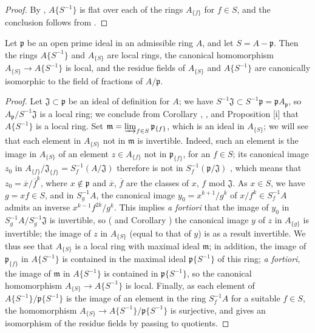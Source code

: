 \begin{proof}
By , $A\{S^{-1}\}$ is flat over each of the rings $A_{\{f\}}$ for
$f\in S$, and the conclusion follows from .
\end{proof}

\begin{proposition}[7.6.17]
\label{0.7.6.17}
Let $\mathfrak{p}$ be an open prime ideal in an admissible ring $A$, and let $S=A-\mathfrak{p}$.
Then the rings $A\{S^{-1}\}$ and $A_{\{S\}}$ are local rings, the canonical homomorphism
$A_{\{S\}}\to A\{S^{-1}\}$ is local, and the residue fields of $A_{\{S\}}$ and $A\{S^{-1}\}$ are
canonically isomorphic to the field of fractions of $A/\mathfrak{p}$.
\end{proposition}

\begin{proof}
Let $\mathfrak{J}\subset\mathfrak{p}$ be an ideal of definition for $A$; we have
$S^{-1}\mathfrak{J}\subset S^{-1}\mathfrak{p}=\mathfrak{p}A_\mathfrak{p}$, so
$A_\mathfrak{p}/S^{-1}\mathfrak{J}$ is a local ring; we conclude from 
Corollary , , and
Proposition [i] that $A\{S^{-1}\}$ is a local ring. Set
$\mathfrak{m}=\varinjlim_{f\in S}\mathfrak{p}_{\{f\}}$, which is an ideal in $A_{\{S\}}$; we
will see that each element in $A_{\{S\}}$ not in $\mathfrak{m}$ is invertible. Indeed, such an
element is the image in $A_{\{S\}}$ of an element $z\in A_{\{f\}}$ not in $\mathfrak{p}_{\{f\}}$,
for an $f\in S$; its canonical image $z_0$ in
$A_{\{f\}}/\mathfrak{J}_{\{f\}}=S_f^{-1}(A/\mathfrak{J})$ therefore is not in
$S_f^{-1}(\mathfrak{p}/\mathfrak{J})$ , which means that
$z_0=\overline{x}/\overline{f}^k$, where $x\not\in\mathfrak{p}$ and $\overline{x}$, $\overline{f}$
are the classes of $x$, $f$ mod $\mathfrak{J}$. As $x\in S$, we have $g=xf\in S$, and in
$S_g^{-1}A$, the canonical image $y_0=x^{k+1}/g^k$ of $x/f^k\in S_f^{-1}A$ admits an inverse
$x^{k-1}f^{2k}/g^k$. This implies \emph{a fortiori} that the image of $y_0$ in
$S_g^{-1}A/S_g^{-1}\mathfrak{J}$ is invertible, so ( and
Corollary ) the canonical image $y$ of $z$ in $A_{\{g\}}$ is
invertible; the image of $z$ in $A_{\{S\}}$ (equal to that of $y$) is as a result invertible.
We thus see that $A_{\{S\}}$ is a local ring with maximal ideal $\mathfrak{m}$; in addition, the image
of $\mathfrak{p}_{\{f\}}$ in $A\{S^{-1}\}$ is contained in the maximal ideal $\mathfrak{p}\{S^{-1}\}$
of this ring; \emph{a fortiori}, the image of $\mathfrak{m}$ in $A\{S^{-1}\}$ is contained in
$\mathfrak{p}\{S^{-1}\}$, so the canonical homomorphism $A_{\{S\}}\to A\{S^{-1}\}$ is local. Finally,
as each element of $A\{S^{-1}\}/\mathfrak{p}\{S^{-1}\}$ is the image of an element in the ring
$S_f^{-1}A$ for a suitable $f\in S$, the homomorphism $A_{\{S\}}\to A\{S^{-1}\}/\mathfrak{p}\{S^{-1}\}$
is surjective, and gives an isomorphism of the residue fields by passing to quotients.
\end{proof}

